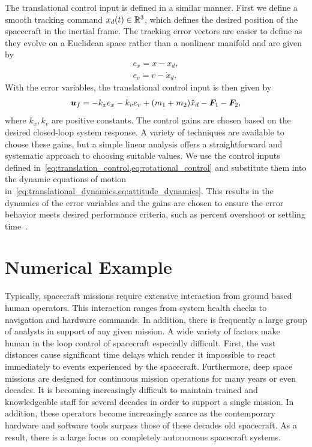 The translational control input is defined in a similar manner. 
First we define a smooth tracking command \( x_d(t) \in \mathbb{R}^3 \), which defines the desired position of the spacecraft in the inertial frame.
The tracking error vectors are easier to define as they evolve on a Euclidean space rather than a nonlinear manifold and are given by
\begin{align}
    e_x = x - x_d ,\\
    e_v = v - \dot{x}_d.
\end{align}
With the error variables, the translational control input is then given by
\begin{align}\label{eq:translation_control}
    \bm{u}_f = - k_x e_x  - k_v e_v + ( m_1  + m_2 ) \ddot{x}_d - \bm{F}_1 - \bm{F}_2 ,
\end{align}
where \( k_x, k_v \) are positive constants. 
The control gains are chosen based on the desired closed-loop system response. 
A variety of techniques are available to choose these gains, but a simple linear analysis offers a straightforward and systematic approach to choosing suitable values. 
We use the control inputs defined in~\cref{eq:translation_control,eq:rotational_control} and substitute them into the dynamic equations of motion in~\cref{eq:translational_dynamics,eq:attitude_dynamics}.
This results in the dynamics of the error variables and the gains are chosen to ensure the error behavior meets desired performance criteria, such as percent overshoot or settling time~\cite{nise2004}.


\section{Numerical Example}

Typically, spacecraft missions require extensive interaction from ground based human operators. 
This interaction ranges from system health checks to navigation and hardware commands.
In addition, there is frequently a large group of analysts in support of any given mission. 
A wide variety of factors make human in the loop control of spacecraft especially difficult.
First, the vast distances cause significant time delays which render it impossible to react immediately to events experienced by the spacecraft. 
Furthermore, deep space missions are designed for continuous mission operations for many years or even decades. 
It is becoming increasingly difficult to maintain trained and knowledgeable staff for several decades in order to support a single mission.
In addition, these operators become increasingly scarce as the contemporary hardware and software tools surpass those of these decades old spacecraft. 
As a result, there is a large focus on completely autonomous spacecraft systems.

